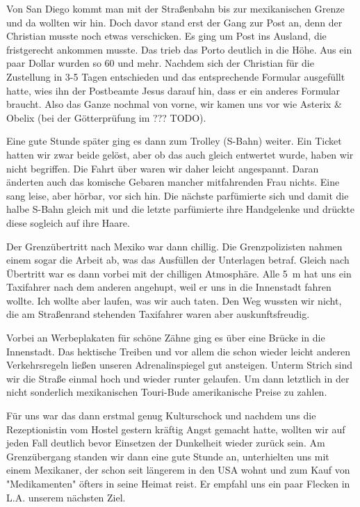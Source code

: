 Von San Diego kommt man mit der Straßenbahn bis zur mexikanischen Grenze und da wollten wir hin.
Doch davor stand erst der Gang zur Post an, denn der Christian musste noch etwas verschicken.
Es ging um Post ins Ausland, die fristgerecht ankommen musste.
Das trieb das Porto deutlich in die Höhe.
Aus ein paar Dollar wurden so 60 und mehr.
Nachdem sich der Christian für die Zustellung in 3-5 Tagen entschieden und das entsprechende Formular ausgefüllt hatte, wies ihn der Postbeamte Jesus darauf hin, dass er ein anderes Formular braucht.
Also das Ganze nochmal von vorne, wir kamen uns vor wie Asterix \& Obelix (bei der Götterprüfung im ??? TODO).

Eine gute Stunde später ging es dann zum Trolley (S-Bahn) weiter.
Ein Ticket hatten wir zwar beide gelöst, aber ob das auch gleich entwertet wurde, haben wir nicht begriffen.
Die Fahrt über waren wir daher leicht angespannt.
Daran änderten auch das komische Gebaren mancher mitfahrenden Frau nichts.
Eine sang leise, aber hörbar, vor sich hin.
Die nächste parfümierte sich und damit die halbe S-Bahn gleich mit und die letzte parfümierte ihre Handgelenke und drückte diese sogleich auf ihre Haare.

Der Grenzübertritt nach Mexiko war dann chillig.
Die Grenzpolizisten nahmen einem sogar die Arbeit ab, was das Ausfüllen der Unterlagen betraf.
Gleich nach Übertritt war es dann vorbei mit der chilligen Atmosphäre.
Alle 5~m hat uns ein Taxifahrer nach dem anderen angehupt, weil er uns in die Innenstadt fahren wollte.
Ich wollte aber laufen, was wir auch taten.
Den Weg wussten wir nicht, die am Straßenrand stehenden Taxifahrer waren aber auskunftsfreudig.

Vorbei an Werbeplakaten für schöne Zähne ging es über eine Brücke in die Innenstadt.
Das hektische Treiben und vor allem die schon wieder leicht anderen Verkehrsregeln ließen unseren Adrenalinspiegel gut ansteigen.
Unterm Strich sind wir die Straße einmal hoch und wieder runter gelaufen.
Um dann letztlich in der nicht sonderlich mexikanischen Touri-Bude amerikanische Preise zu zahlen.

Für uns war das dann erstmal genug Kulturschock und nachdem uns die Rezeptionistin vom Hostel gestern kräftig Angst gemacht hatte, wollten wir auf jeden Fall deutlich bevor Einsetzen der Dunkelheit wieder zurück sein.
Am Grenzübergang standen wir dann eine gute Stunde an, unterhielten uns mit einem Mexikaner, der schon seit längerem in den USA wohnt und zum Kauf von "Medikamenten" öfters in seine Heimat reist.
Er empfahl uns ein paar Flecken in L.A. unserem nächsten Ziel.

